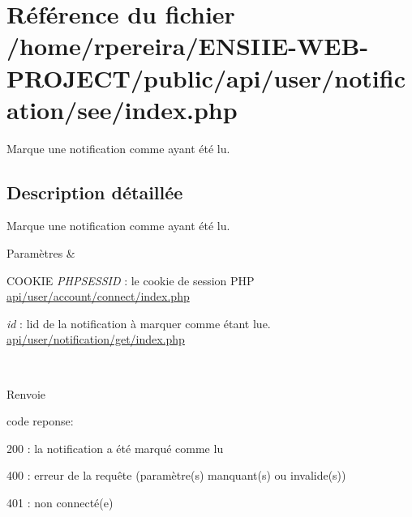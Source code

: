 \hypertarget{user_2notification_2see_2index_8php}{}\section{Référence du fichier /home/rpereira/\+E\+N\+S\+I\+I\+E-\/\+W\+E\+B-\/\+P\+R\+O\+J\+E\+C\+T/public/api/user/notification/see/index.php}
\label{user_2notification_2see_2index_8php}


Marque une notification comme ayant été lu.  




\subsection{Description détaillée}
Marque une notification comme ayant été lu. 


\begin{DoxyParams}{Paramètres}
{\em } & 
\begin{DoxyItemize}
\item C\+O\+O\+K\+IE {\itshape P\+H\+P\+S\+E\+S\+S\+ID} \+: le cookie de session P\+HP \hyperlink{user_2account_2connect_2index_8php}{api/user/account/connect/index.\+php}
\item {\itshape id} \+: l\textquotesingle{}id de la notification à marquer comme étant lue. \hyperlink{user_2notification_2get_2index_8php}{api/user/notification/get/index.\+php} 
\end{DoxyItemize}\\
\hline
\end{DoxyParams}
\begin{DoxyReturn}{Renvoie}

\begin{DoxyItemize}
\item code reponse\+:
\begin{DoxyItemize}
\item 200 \+: la notification a été marqué comme lu
\item 400 \+: erreur de la requête (paramètre(s) manquant(s) ou invalide(s))
\item 401 \+: non connecté(e) 
\end{DoxyItemize}
\end{DoxyItemize}
\end{DoxyReturn}
